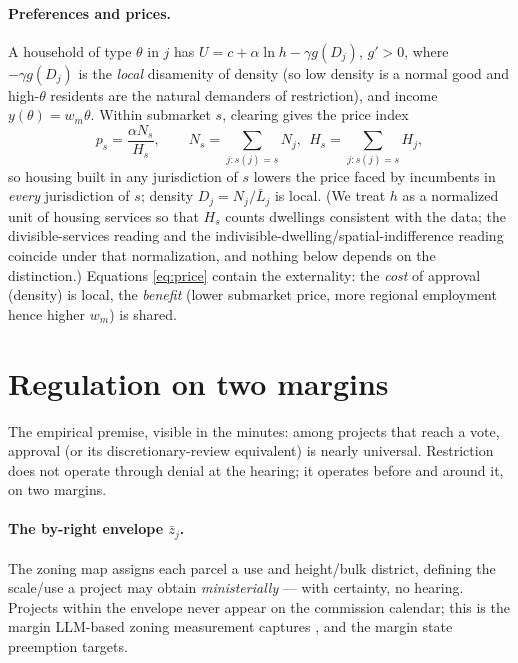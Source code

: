 \documentclass[11pt]{article}
\begin{document}
\paragraph{Preferences and prices.} A household of type $\theta$ in $j$ has
$U=c+\alpha\ln h-\gamma g(D_j)$, $g'>0$, where $-\gamma g(D_j)$ is the \emph{local} disamenity of
density (so low density is a normal good and high-$\theta$ residents are the natural demanders of
restriction), and income $y(\theta)=w_m\theta$. Within submarket $s$, clearing gives the price
index
\begin{equation}
p_{s} = \frac{\alpha N_{s}}{H_{s}}, \qquad
N_s=\!\!\sum_{j:s(j)=s}\!\!N_j,\ \ H_s=\!\!\sum_{j:s(j)=s}\!\!H_j,
\label{eq:price}
\end{equation}
so housing built in any jurisdiction of $s$ lowers the price faced by incumbents in \emph{every}
jurisdiction of $s$; density $D_j=N_j/\bar L_j$ is local. (We treat $h$ as a normalized unit of
housing services so that $H_s$ counts dwellings consistent with the data; the divisible-services
reading and the indivisible-dwelling/spatial-indifference reading coincide under that
normalization, and nothing below depends on the distinction.) Equations
\eqref{eq:price} contain the externality: the \emph{cost} of approval (density) is local, the
\emph{benefit} (lower submarket price, more regional employment hence higher $w_m$) is shared.

\section{Regulation on two margins}\label{sec:tech}

The empirical premise, visible in the minutes: among projects that reach a vote, approval (or
its discretionary-review equivalent) is nearly universal. Restriction does not operate through
denial at the hearing; it operates before and around it, on two margins.

\paragraph{The by-right envelope $\bar z_j$.} The zoning map assigns each parcel a use and
height/bulk district, defining the scale/use a project may obtain \emph{ministerially} --- with
certainty, no hearing. Projects within the envelope never appear on the commission calendar;
this is the margin LLM-based zoning measurement captures \citep{bartik2024costs}, and the margin
state preemption targets.
\end{document}

